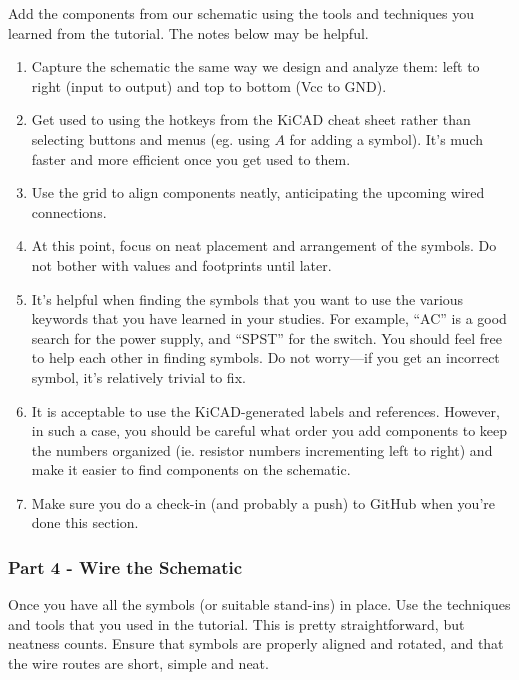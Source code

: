 \documentclass[
  letterpaper,
  DIV=11,
  numbers=noendperiod,
  oneside]{scrartcl}
\begin{document}
Add the components from our schematic using the tools and techniques you
learned from the tutorial. The notes below may be helpful.

\begin{enumerate}
\def\labelenumi{\arabic{enumi}.}
\item
  Capture the schematic the same way we design and analyze them: left to
  right (input to output) and top to bottom (Vcc to GND).
\item
  Get used to using the hotkeys from the KiCAD cheat sheet rather than
  selecting buttons and menus (eg. using \(A\) for adding a symbol).
  It's much faster and more efficient once you get used to them.
\item
  Use the grid to align components neatly, anticipating the upcoming
  wired connections.
\item
  At this point, focus on neat placement and arrangement of the symbols.
  Do not bother with values and footprints until later.
\item
  It's helpful when finding the symbols that you want to use the various
  keywords that you have learned in your studies. For example, ``AC'' is
  a good search for the power supply, and ``SPST'' for the switch. You should feel free to help
  each other in finding symbols. Do not worry---if you get an incorrect
  symbol, it's relatively trivial to fix.
\item
  It is acceptable to use the KiCAD-generated labels and references.
  However, in such a case, you should be careful what order you add
  components to keep the numbers organized (ie. resistor numbers
  incrementing left to right) and make it easier to find components on
  the schematic.
\item
  Make sure you do a check-in (and probably a push) to GitHub when
  you're done this section.
\end{enumerate}

\subsubsection{Part 4 - Wire the
Schematic}\label{part-4---wire-the-schematic}

Once you have all the symbols (or suitable stand-ins) in place. Use the
techniques and tools that you used in the tutorial. This is pretty
straightforward, but neatness counts. Ensure that symbols are properly
aligned and rotated, and that the wire routes are short, simple and
neat.
\end{document}
